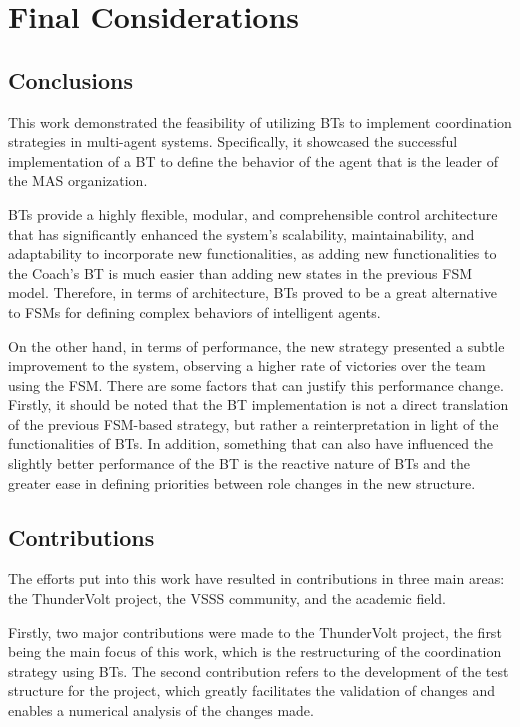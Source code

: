 \chapter{Final Considerations}
\label{ch:final_considerations}

\section{Conclusions}

This work demonstrated the feasibility of utilizing BTs to implement coordination strategies in multi-agent systems. Specifically, it showcased the successful implementation of a BT to define the behavior of the agent that is the leader of the MAS organization.

BTs provide a highly flexible, modular, and comprehensible control architecture that has significantly enhanced the system's scalability, maintainability, and adaptability to incorporate new functionalities, as adding new functionalities to the Coach's BT is much easier than adding new states in the previous FSM model. Therefore, in terms of architecture, BTs proved to be a great alternative to FSMs for defining complex behaviors of intelligent agents.

On the other hand, in terms of performance, the new strategy presented a subtle improvement to the system, observing a higher rate of victories over the team using the FSM. There are some factors that can justify this performance change.  Firstly, it should be noted that the BT implementation is not a direct translation of the previous FSM-based strategy, but rather a reinterpretation in light of the functionalities of BTs. In addition, something that can also have influenced the slightly better performance of the BT is the reactive nature of BTs and the greater ease in defining priorities between role changes in the new structure.

\section{Contributions}

The efforts put into this work have resulted in contributions in three main areas: the ThunderVolt project, the VSSS community, and the academic field.

Firstly, two major contributions were made to the ThunderVolt project, the first being the main focus of this work, which is the restructuring of the coordination strategy using BTs. The second contribution refers to the development of the test structure for the project, which greatly facilitates the validation of changes and enables a numerical analysis of the changes made.

